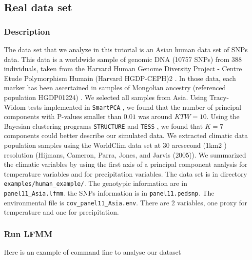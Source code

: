 \documentclass[10pt,a4paper]{article}
\begin{document}
\subsection{Real data set}
\subsubsection{Description}
The data set that we analyze in this tutorial is an Asian human data set of SNPs data.
This data is a worldwide sample of genomic DNA (10757 SNPs) from 388 individuals,
taken from the Harvard Human Genome Diversity Project - Centre
Etude Polymorphism Humain (Harvard HGDP-CEPH)2 . In those
data, each marker has been ascertained in samples of Mongolian
ancestry (referenced population HGDP01224) \cite{Patterson_2012}. We selected all
samples from Asia.
Using Tracy-Widom tests implemented in {\tt SmartPCA} \cite{Patterson_2006}, we found that the number of
principal components with P-values smaller than $0.01$ was around $KTW = 10$. Using
the Bayesian clustering programs {\tt STRUCTURE} \cite{Pritchard_2000} and 
{\tt TESS} \cite{Chen_2007, Durand_2009}, we found that $K = 7$
components could better describe our simulated data.
We extracted climatic data population samples using the WorldClim
data set at 30 arcsecond (1km2 ) resolution
(Hijmans, Cameron, Parra, Jones, and Jarvis (2005)).
We summarized the climatic variables by using the first axis of a
principal component analysis for temperature variables and for
precipitation variables.
The data set is in directory \verb|examples/human_example/|. The genotypic information
are in \verb|panel11_Asia.lfmm|. the SNPs information is in \verb|panel11.pedsnp|.
The environmental file is \verb|cov_panel11_Asia.env|. There are 2 variables, one proxy
for temperature and one for precipitation.

\subsubsection{Run LFMM}
Here is an example of command line to analyse our dataset
\end{document}
